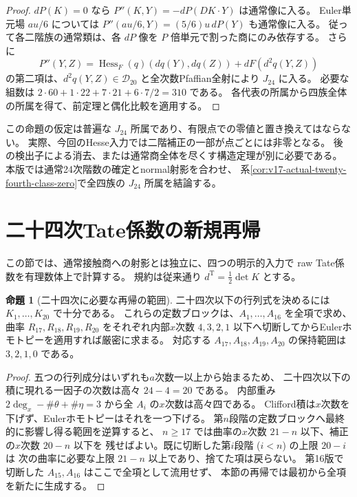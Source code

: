 \documentclass[a4paper,11pt]{ltjsarticle}
\theoremstyle{definition}
\newtheorem{proposition}[theorem]{命題}
\begin{document}
\begin{proof}
$dP(K)=0$ なら
$P''(K,Y)=-dP(DK\cdot Y)$ は通常像に入る。
Euler単元場 $au/6$ については
$P''(au/6,Y)=(5/6)u\,dP(Y)$ も通常像に入る。
従って各二階族の通常類は、各 $dP$ 像を $P$ 倍単元で割った商にのみ依存する。
さらに
\[
 P''(Y,Z)=\operatorname{Hess}_F(q)(dq(Y),dq(Z))
                 +dF(d^2q(Y,Z))
\]
の第二項は、$d^2q(Y,Z)\in\mathcal D_{20}$ と全次数Pfaffian全射により $J_{24}$ に入る。
必要な組数は $2\cdot60+1\cdot22+7\cdot21+6\cdot7/2=310$ である。
各代表の所属から四族全体の所属を得て、前定理と偶化比較を適用する。
\end{proof}

この命題の仮定は普遍な $J_{24}$ 所属であり、有限点での零値と置き換えてはならない。
実際、今回のHesse入力では二階補正の一部が点ごとには非零となる。
後の検出子による消去、または通常商全体を尽くす構造定理が別に必要である。
本版では通常24次階数の確定とnormal射影を合わせ、
系\ref{cor:v17-actual-twenty-fourth-class-zero}で全四族の $J_{24}$ 所属を結論する。



\section{二十四次Tate係数の新規再帰}
\label{sec:v17-tate24}
この節では、通常接触商への射影とは独立に、四つの明示的入力で
raw Tate係数を有理数体上で計算する。
規約は従来通り $d^{\mathrm T}=\tfrac12\det K$ とする。

\begin{proposition}[二十四次に必要な再帰の範囲]\label{prop:v17-tate-truncation}
二十四次以下の行列式を決めるには $K_1,\ldots,K_{20}$ で十分である。
これらの定数ブロックは、$A_1,\ldots,A_{16}$ を全項で求め、
曲率 $R_{17},R_{18},R_{19},R_{20}$ をそれぞれ内部$x$次数
$4,3,2,1$ 以下へ切断してからEulerホモトピーを適用すれば厳密に求まる。
対応する $A_{17},A_{18},A_{19},A_{20}$ の保持範囲は $3,2,1,0$ である。
\end{proposition}
\begin{proof}
五つの行列成分はいずれも$a$次数一以上から始まるため、
二十四次以下の積に現れる一因子の次数は高々 $24-4=20$ である。
内部重み $2\deg_x-\#\theta+\#\eta=3$ から全 $A_i$ の$x$次数は高々四である。
Clifford積は$x$次数を下げず、Eulerホモトピーはそれを一つ下げる。
第$n$段階の定数ブロックへ最終的に影響し得る範囲を逆算すると、
$n\ge17$ では曲率の$x$次数 $21-n$ 以下、補正の$x$次数 $20-n$ 以下を
残せばよい。既に切断した第$i$段階 ($i<n$) の上限 $20-i$ は
次の曲率に必要な上限 $21-n$ 以上であり、捨てた項は戻らない。
第16版で切断した $A_{15},A_{16}$ はここで全項として流用せず、
本節の再帰では最初から全項を新たに生成する。
\end{proof}
\end{document}
